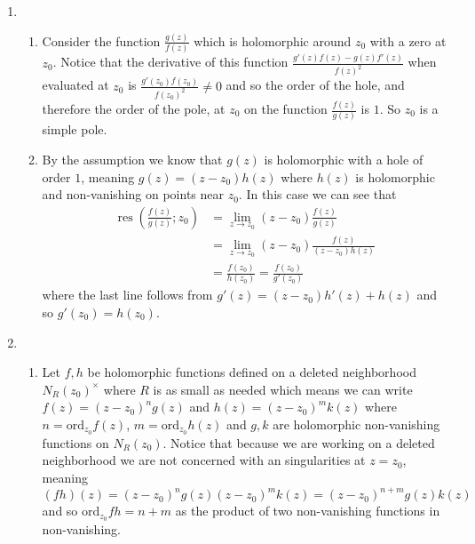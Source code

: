 \documentclass[12pt]{amsart}
\theoremstyle{definition}
\DeclareMathOperator{\res}{\mathrm{res}}
\newcommand{\ra}{\rightarrow}
\begin{document}
\begin{enumerate}
    \item
    \begin{enumerate}
        \item Consider the function $\frac{g(z)}{f(z)}$ which is holomorphic around $z_0$ with a zero at $z_0$. Notice that the derivative of this function $\frac{g'(z)f(z)-g(z)f'(z)}{f(z)^2}$ when evaluated at $z_0$ is $\frac{g'(z_0)f(z_0)}{f(z_0)^2}\neq 0$ and so the order of the hole, and therefore the order of the pole, at $z_0$ on the function $\frac{f(z)}{g(z)}$ is $1$. So $z_0$ is a simple pole.\\

        \item By the assumption we know that $g(z)$ is holomorphic with a hole of order $1$, meaning $g(z)=(z-z_0)h(z)$ where $h(z)$ is holomorphic and non-vanishing on points near $z_0$. In this case we can see that
        \begin{align*}
        \res\left(\frac{f(z)}{g(z)};z_0\right)&=\lim_{z\ra z_0}(z-z_0)\frac{f(z)}{g(z)}\\
        &= \lim_{z\ra z_0}(z-z_0)\frac{f(z)}{(z-z_0)h(z)}\\
        &=\frac{f(z_0)}{h(z_0)}=\frac{f(z_0)}{g'(z_0)}
    \end{align*}
        where the last line follows from $g'(z)=(z-z_0)h'(z)+h(z)$ and so $g'(z_0)=h(z_0)$.\\
    \end{enumerate}

    \item
    \begin{enumerate}
        \item Let $f,h$ be holomorphic functions defined on a deleted neighborhood $N_R(z_0)^\times$ where $R$ is as small as needed which means we can write $f(z)=(z-z_0)^n g(z)$ and $h(z)=(z-z_0)^mk(z)$ where $n=\text{ord}_{z_0}f(z)$, $m=\text{ord}_{z_0}h(z)$ and $g,k$ are holomorphic non-vanishing functions on $N_R(z_0)$. Notice that because we are working on a deleted neighborhood we are not concerned with an singularities at $z=z_0$, meaning $$(fh)(z)=(z-z_0)^n g(z)(z-z_0)^m k(z)=(z-z_0)^{n+m} g(z) k(z)$$
        and so $\text{ord}_{z_0}fh=n+m$ as the product of two non-vanishing functions in non-vanishing.\\


\end{enumerate}
\end{enumerate}
\end{document}

